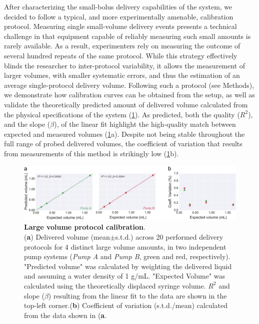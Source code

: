 After characterizing the small-bolus delivery capabilities of the system, we decided to follow a typical, and more experimentally amenable, calibration protocol. Measuring single small-volume delivery events presents a technical challenge in that equipment capable of reliably measuring such small amounts is rarely available. As a result, experimenters rely on measuring the outcome of several hundred repeats of the same protocol. While this strategy effectively blinds the researcher to inter-protocol variability, it allows the measurement of larger volumes, with smaller systematic errors, and thus the estimation of an average single-protocol delivery volume. Following such a protocol (see Methods), we demonstrate how calibration curves can be obtained from the setup, as well as validate the theoretically predicted amount of delivered volume calculated from the physical specifications of the system (\cref{fig:LargeVolumeCalibration}). As predicted, both the quality  ($R^2$), and the slope ($\beta$), of the linear fit highlight the high-quality match between expected and measured volumes (\cref{fig:LargeVolumeCalibration}a). Despite not being stable throughout the full range of probed delivered volumes, the coefficient of variation that results from measurements of this method is strikingly low (\cref{fig:LargeVolumeCalibration}b). 

\begin{figure}[ht] 
	\centering
	\includegraphics[width=1.0\linewidth]{Figures/Artboard 6.pdf}
	\caption{\textbf{Large volume protocol calibration}.\\
		(\textbf{a}) Delivered volume (mean$\pm$s.t.d.) across 20 performed delivery protocols for 4 distinct large volume amounts, in two independent pump systems (\textit{Pump A} and \textit{Pump B}, green and red, respectively). "Predicted volume" was calculated by weighting the delivered liquid and assuming a water density of 1 g/mL. "Expected Volume" was calculated using the theoretically displaced syringe volume.  $R^{2}$ and slope ($\beta$) resulting from the linear fit to the data are shown in the top-left corner.(\textbf{b}) Coefficient of variation (s.t.d./mean) calculated from the data shown in (\textbf{a}.}
	\label{fig:LargeVolumeCalibration} 
\end{figure}

